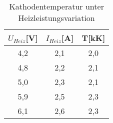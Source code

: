 \begin{table}[h]
	\begin{center}
		\begin{tabular}{ccc}
			$U_{Heiz}$[V]&$I_{Heiz}$[A]&T[kK] \\ \hline
			4{,}2&2{,}1&2{,}0\\
			4{,}8&2{,}2&2{,}1\\
			5{,}0&2{,}3&2{,}1\\
			5{,}9&2{,}5&2{,}3\\
			6{,}1&2{,}6&2{,}3
		\end{tabular}
		\caption{Kathodentemperatur unter Heizleistungsvariation}
		\label{tabkattemp}
	\end{center}
\end{table}